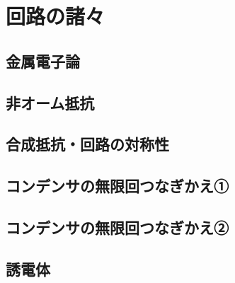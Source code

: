 \documentclass[../../ps_q.tex]{subfiles}
\begin{document}
\section{回路の諸々}

\subsection{金属電子論}
    

    \vspace{2cm}
    \vfill

\subsection{非オーム抵抗}
    

    \vspace{2cm}
    \vfill

\subsection{合成抵抗・回路の対称性}
    

    \vspace{2cm}
    \vfill

\subsection{コンデンサの無限回つなぎかえ①}
    

    \vspace{2cm}
    \vfill 

\subsection{コンデンサの無限回つなぎかえ②}
       

    \vspace{2cm}
    \vfill

\subsection{誘電体}
    

    \vspace{2cm}
    \vfill
\end{document}
